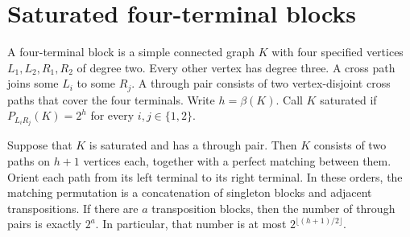 \section{Saturated four-terminal blocks}
\label{sec:second-order-four-poles}

A four-terminal block is a simple connected graph $K$ with four specified vertices
$L_1,L_2,R_1,R_2$ of degree two.
Every other vertex has degree three.
A cross path joins some $L_i$ to some $R_j$.
A through pair consists of two vertex-disjoint cross paths that cover the four terminals.
Write $h=\beta(K)$.
Call $K$ saturated if $P_{L_iR_j}(K)=2^h$ for every $i,j\in\{1,2\}$.

\begin{proposition}\label{prop:saturated-four-pole}
Suppose that $K$ is saturated and has a through pair.
Then $K$ consists of two paths on $h+1$ vertices each, together with a perfect matching between them.
Orient each path from its left terminal to its right terminal.
In these orders, the matching permutation is a concatenation of singleton blocks and adjacent transpositions.
If there are $a$ transposition blocks, then the number of through pairs is exactly $2^a$.
In particular, that number is at most $2^{\lfloor(h+1)/2\rfloor}$.
\end{proposition}

